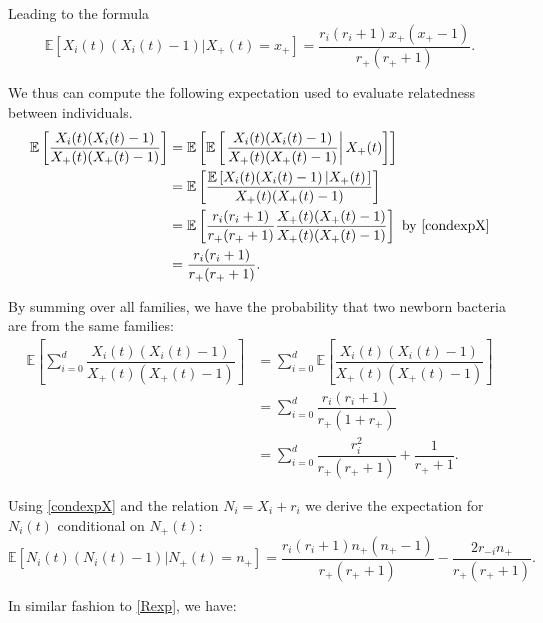 \documentclass{article}
\begin{document}
Leading to the formula
\begin{equation}
 \mathbb{E} [ X_i(t)(X_i(t)-1) \vert X_+(t)=x_+ ] =\dfrac{r_i(r_i+1) x_+ ( x_+ -1 ) }{r_+ (r_+ +1 )}. \label{condexpX}
\end{equation}

We thus can compute the following expectation used to evaluate relatedness between individuals.
\begin{align}
\label{Rexp}
\mathbb{E}\left[ \dfrac{X_i(t)(X_i(t)-1)}{X_+(t) (X_+(t)-1)} \right] &= \mathbb{E}\left[ \mathbb{E}\left[ \left. \dfrac{X_i(t)(X_i(t)-1)}{X_+(t) ( X_+(t)-1 ) } \right\vert X_+(t) \right] \right]\\
&= \mathbb{E}\left[  \dfrac{\mathbb{E}\left[ X_i(t)(X_i(t)-1) \left\vert X_+(t) \right. \right] }{X_+(t) (X_+(t)-1 ) }  \right]\\
 &=\mathbb{E}\left[\dfrac{r_i(r_i+1)}{r_+ (r_+ +1)} \dfrac{X_+(t)( X_+(t)-1)}{X_+(t)( X_+(t)-1 ) } \right] \text{ by \eqref{condexpX}}\\
 &=\dfrac{r_i(r_i+1)}{r_+ (r_+ +1 )}.
\end{align}

By summing over all families, we have the probability that two newborn bacteria are from the same families:
\begin{align}
\mathbb{E}\left[ \displaystyle \sum_{i=0}^d \dfrac{X_i(t)(X_i(t)-1)}{X_+(t) (X_+(t)-1)} \right] &= \displaystyle \sum_{i=0}^d \mathbb{E}\left[  \dfrac{X_i(t)(X_i(t)-1)}{X_+(t)( X_+(t)-1 ) } \right]\\
&= \displaystyle \sum_{i=0}^d \dfrac{r_i(r_i+1)}{r_+ (1+r_+ )} \\
&= \displaystyle \sum_{i=0}^d \dfrac{r_i^2}{r_+ (r_+ +1)} +\dfrac{1}{ r_+ +1}.
\end{align}


Using \eqref{condexpX} and the relation $N_i=X_i+r_i$ we derive the expectation for $N_i(t)$ conditional on $N_+(t)$:
\begin{equation}
 \mathbb{E} [ N_i(t)(N_i(t)-1) \vert N_+(t)=n_+ ] =\dfrac{r_i(r_i+1) n_+ \left( n_+ -1 \right) }{r_+ (r_+ +1)} -
 \dfrac{2 r_{-i} n_+ }{r_+ (r_+ +1)}. \label{condexpN}
\end{equation}

In similar fashion to \eqref{Rexp}, we have:
\end{document}
